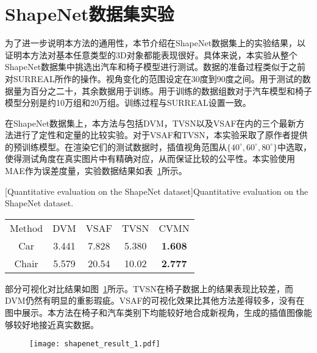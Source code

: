\section{ShapeNet数据集实验}
为了进一步说明本方法的通用性，本节介绍在ShapeNet数据集\citep{shapenet2015}上的实验结果，以证明本方法对基本任意类型的3D对象都能表现很好。具体来说，本实验从整个ShapeNet数据集中挑选出汽车和椅子模型进行测试。数据的准备过程类似于之前对SURREAL所作的操作。视角变化的范围设定在30度到90度之间。用于测试的数据量为百分之二十，其余数据用于训练。用于训练的数据组数对于汽车模型和椅子模型分别是约10万组和20万组。训练过程与SURREAL设置一致。

在ShapeNet数据集上，本方法与包括DVM\citep{Ji_2017_CVPR}，TVSN\citep{tvsn_cvpr2017}以及VSAF\citep{zhou2016view}在内的三个最新方法进行了定性和定量的比较实验。对于VSAF和TVSN，本实验采取了原作者提供的预训练模型。在渲染它们的测试数据时，插值视角范围从$\{40^\circ, 60^\circ, 80^\circ\}$中选取，使得测试角度在真实图片中有精确对应，从而保证比较的公平性。本实验使用MAE作为误差度量，实验数据结果如表~\ref{tab:cvmn_shapenet}所示。
\begin{table}
[Quantitative evaluation on the ShapeNet dataset]{Quantitative evaluation on the ShapeNet dataset.}
\label{tab:cvmn_shapenet}
\centering
\footnotesize%
\setlength{\tabcolsep}{4pt}%
\renewcommand{\arraystretch}{0.9}%
\begin{tabular}{c c c c c}
\hline\noalign{\smallskip}
Method  & DVM\citep{Ji_2017_CVPR} & VSAF\citep{zhou2016view} & TVSN\citep{tvsn_cvpr2017}& CVMN \\
\noalign{\smallskip}
\hline
\noalign{\smallskip}
Car   & 3.441 & 7.828 & 5.380 & \textbf{1.608}\\
Chair & 5.579 & 20.54 & 10.02 & \textbf{2.777}\\
\hline
\end{tabular}
\end{table}
部分可视化对比结果如图~\ref{fig:cvmn_shapenet}所示。TVSN在椅子数据上的结果表现比较差，而DVM仍然有明显的重影瑕疵。VSAF的可视化效果比其他方法差得较多，没有在图中展示。本方法在椅子和汽车类别下均能较好地合成新视角，生成的插值图像能够较好地接近真实数据。
\begin{figure}[!htbp]
    \centering
    \texttt{[image: shapenet\_result\_1.pdf]}
    \label{fig:cvmn_shapenet}
\end{figure}

